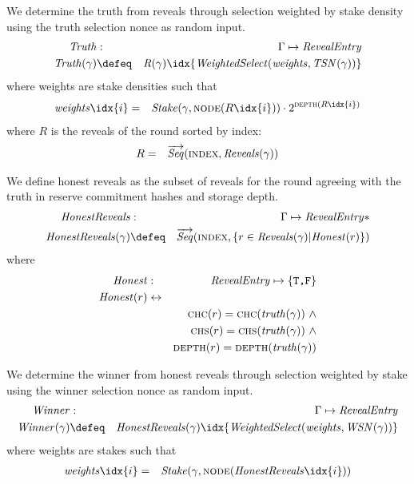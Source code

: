 \begin{definition}
\label{def:truth-selection}
We determine the truth from reveals through selection weighted by stake density using the truth selection nonce as random input. 
\begin{eqnarray}
\mathit{Truth}&:& \Gamma\mapsto\mathit{RevealEntry}\\
\mathit{Truth}(\gamma)&\defeq&\mathit{R}(\gamma)\idx{\mathit{WeightedSelect}(\mathit{weights},\mathit{TSN}(\gamma))}
\end{eqnarray}
where weights are stake densities such that 
\begin{eqnarray}
\mathit{weights}\idx{i}&=&\mathit{Stake}(\gamma,\textsc{node}(R\idx{i}))\cdot 2^{\textsc{depth}(R\idx{i})}
\end{eqnarray}
where $R$ is the reveals of the round sorted by index:
\begin{eqnarray}
R&=&\overrightarrow{\mathit{Seq}}(\textsc{index},\mathit{Reveals}(\gamma))
\end{eqnarray}
\end{definition}

\begin{definition}
We define honest reveals as the subset of reveals for the round agreeing with the truth in reserve commitment hashes and storage depth.
\label{def:honest-reveals}
\begin{eqnarray}
\mathit{HonestReveals}&:&\Gamma\mapsto\mathit{RevealEntry}{*}\\
\mathit{HonestReveals}(\gamma)&\defeq&\overrightarrow{\mathit{Seq}}(\textsc{index},\{r\in\mathit{Reveals}(\gamma)|\mathit{Honest}(r)\})
\end{eqnarray}
where
\begin{eqnarray}
\mathit{Honest}&:&\mathit{RevealEntry}\mapsto\{\texttt{T,F}\}\\
\mathit{Honest}(r)&\leftrightarrow&\\
&&\textsc{chc}(r)=\textsc{chc}(\mathit{truth}(\gamma))\ \land\\
&&\textsc{chs}(r)=\textsc{chs}(\mathit{truth}(\gamma))\ \land\\
&&\textsc{depth}(r)=\textsc{depth}(\mathit{truth}(\gamma))
\end{eqnarray}
\end{definition}

\begin{definition}
\label{def:winner-selection}
We determine the winner from honest reveals through selection weighted by stake using the winner selection nonce as random input. 
\begin{eqnarray}
\mathit{Winner}&:& \Gamma\mapsto\mathit{RevealEntry}\\
\mathit{Winner}(\gamma)&\defeq&\mathit{HonestReveals}(\gamma)\idx{\mathit{WeightedSelect}(\mathit{weights},\mathit{WSN}(\gamma))}
\end{eqnarray}
where weights are stakes such that 
\begin{eqnarray}
\mathit{weights}\idx{i}&=&\mathit{Stake}(\gamma,\textsc{node}(\mathit{HonestReveals}\idx{i}))
\end{eqnarray}
\end{definition}

